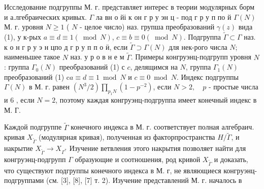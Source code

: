 \documentclass[10pt]{article}
\begin{document}
Исследование подгруппы М. г. представляет интерес в теории модулярных борм и а.лгебраических кривых. $\Gamma$ ла вн о йі к он г р у эн ц - под г р у п по й $\Gamma(N)$ М. г. уровня $N \geqslant 1$ ( $N$ - целое число) наз. групша преобразований $\gamma(z)$ вида (1), у к-рых $a \equiv d \equiv 1(\bmod N)$, $c \equiv b \equiv 0(\bmod N)$. Подгруппа $\tilde{\Gamma} \subset \Gamma$ наз. к о н г р у э н цпо д г р у п п о ӥ, если $\tilde{\Gamma} \supset \Gamma(N)$ для нек-рого числа $N$; наименьшее такое $N$ наз. у р о в н е м $\tilde{\Gamma}$. Примеры конгруэнц-подгрупп уровня $N$ : группа $\Gamma_{0}(N)$ преобразований (1) с $c$, делящимся на $N$, группа $\Gamma_{1}(N)$ преобразований (1) $\mathrm{c} a \equiv d \equiv 1 \bmod N$ и $c \equiv 0 \bmod N$. Индекс подгруппы $\Gamma(N)$ в М. г. равен $\left(N^{3} / 2\right) \prod_{p_{1} N}\left(1-p^{-2}\right)$, если $N>2, \quad p$ - простые числа и 6 , если $N=2$, поэтому каждая конгруэнц-подгруппа имеет конечный индекс в М. Г.



Каждой подгруппе $\tilde{\Gamma}$ конечного индекса в М. г. соответствует полная алгебраич. кривая $X_{\tilde{\Gamma}}$ (модулярная кривая), полученная из факторпространства $H / \tilde{\Gamma}$, и накрытие $X_{\tilde{\Gamma}} \rightarrow X_{\Gamma^{*}}$ Изучение ветвления этого накрытия позволяет найти для конгруэнц-подгрупп $\Gamma$ образующие и соотношения, род кривой $X_{\tilde{\Gamma}}$ и доказать, что существуют подгруппы конечного индекса в М. г, не являющиеся конгруэнц-подгруппами (см. [3], [8], [7] т. 2). Изучение представлений М. г. началось в
\end{document}
